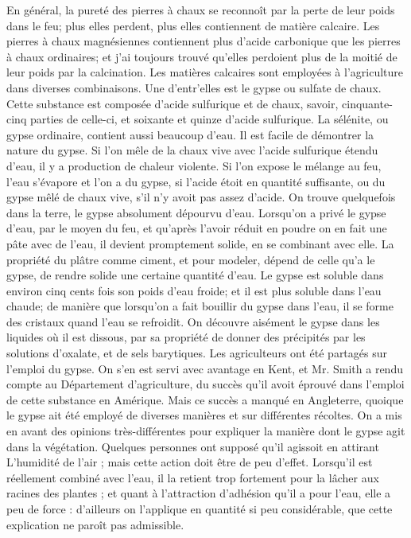 En général, la pureté des pierres à chaux se reconnoît par la perte de leur poids dans le feu; plus elles perdent, plus elles contiennent de matière calcaire. Les pierres à chaux magnésiennes contiennent plus d'acide carbonique que les pierres à chaux ordinaires; et j'ai toujours trouvé qu'elles perdoient plus de la moitié de leur poids par la calcination.
Les matières calcaires sont employées à l'agriculture dans diverses combinaisons. Une d'entr'elles est le gypse ou sulfate de chaux. Cette substance est composée d'acide sulfurique et de chaux, savoir, cinquante-cinq parties de celle-ci, et soixante et quinze d'acide sulfurique. La sélénite, ou gypse ordinaire, contient aussi beaucoup d'eau.
Il est facile de démontrer la nature du gypse. Si l'on mêle de la chaux vive avec l'acide sulfurique étendu d'eau, il y a production de chaleur violente. Si l'on expose le mélange au feu, l'eau s'évapore et l'on a du gypse, si l'acide étoit en quantité suffisante, ou du gypse mêlé de chaux vive, s'il n'y avoit pas assez d'acide. On trouve quelquefois dans la terre, le gypse absolument dépourvu d'eau.\setcounter{page}{234} Lorsqu'on a privé le gypse d'eau, par le moyen du feu, et qu'après l'avoir réduit en poudre on en fait une pâte avec de l'eau, il devient promptement solide, en se combinant avec elle. La propriété du plâtre comme ciment, et pour modeler, dépend de celle qu'a le gypse, de rendre solide une certaine quantité d'eau. Le gypse est soluble dans environ cinq cents fois son poids d'eau froide; et il est plus soluble dans l'eau chaude; de manière que lorsqu'on a fait bouillir du gypse dans l'eau, il se forme des cristaux quand l'eau se refroidit. On découvre aisément le gypse dans les liquides où il est dissous, par sa propriété de donner des précipités par les solutions d'oxalate, et de sels barytiques. Les agriculteurs ont été partagés sur l'emploi du gypse. On s'en est servi avec avantage en Kent, et Mr. Smith a rendu compte au Département d'agriculture, du succès qu'il avoit éprouvé dans l'emploi de cette substance en Amérique. Mais ce succès a manqué en Angleterre, quoique le gypse ait été employé de diverses manières et sur différentes récoltes. On a mis en avant des opinions très-différentes pour expliquer la manière dont le gypse agit dans la végétation. Quelques personnes ont supposé qu'il agissoit en attirant\setcounter{page}{235} L'humidité de l'air ; mais cette action doit être de peu d'effet. Lorsqu'il est réellement combiné avec l'eau, il la retient trop fortement pour la lâcher aux racines des plantes ; et quant à l'attraction d'adhésion qu'il a pour l'eau, elle a peu de force : d'ailleurs on l'applique en quantité si peu considérable, que cette explication ne paroît pas admissible.
